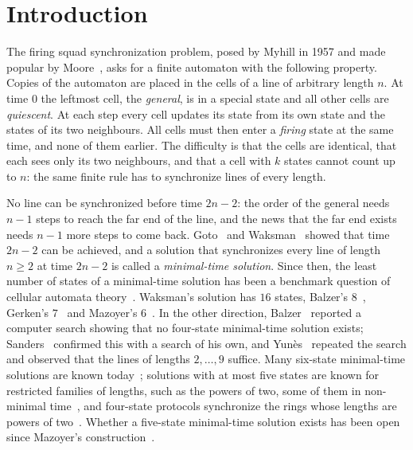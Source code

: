 \section{Introduction}\label{sec:intro}

The firing squad synchronization problem, posed by Myhill in 1957 and made
popular by Moore~\cite{Moore64}, asks for a finite automaton with the following
property. Copies of the automaton are placed in the cells of a line of
arbitrary length $n$. At time $0$ the leftmost cell, the \emph{general}, is in a
special state and all other cells are \emph{quiescent}. At each step every cell
updates its state from its own state and the states of its two neighbours. All
cells must then enter a \emph{firing} state at the same time, and none of them
earlier. The difficulty is that the cells are identical, that each sees only
its two neighbours, and that a cell with $k$ states cannot count up to $n$:
the same finite rule has to synchronize lines of every length.

No line can be synchronized before time $2n-2$: the order of the general needs
$n-1$ steps to reach the far end of the line, and the news that the far end
exists needs $n-1$ more steps to come back. Goto~\cite{Goto62} and
Waksman~\cite{Waksman66} showed that time $2n-2$ can be achieved, and a
solution that synchronizes every line of length $n\ge2$ at time $2n-2$ is
called a \emph{minimal-time solution}. Since then, the least number of states
of a minimal-time solution has been a benchmark question of cellular automata
theory~\cite{Mazoyer86,Umeo09,Correa17}. Waksman's solution has $16$ states,
Balzer's $8$~\cite{Balzer67}, Gerken's $7$~\cite{Gerken87} and Mazoyer's
$6$~\cite{Mazoyer87}. In the other direction, Balzer~\cite{Balzer67} reported
a computer search showing that no four-state minimal-time solution exists;
Sanders~\cite{Sanders94} confirmed this with a search of his own, and
Yun\`es~\cite{Yunes93} repeated the search and observed that the lines of
lengths $2,\dots,9$ suffice. Many
six-state minimal-time solutions are known today~\cite{Clergue18,NguyenMaignan20};
solutions with at most five states are known for restricted families of
lengths, such as the powers of two, some of them in non-minimal
time~\cite{UmeoYanagihara07,Yunes08}, and four-state protocols synchronize the
rings whose lengths are powers of two~\cite{UmeoKamikawaYunes09}. Whether a
five-state minimal-time solution exists has been open since Mazoyer's
construction~\cite{Umeo09,Correa17}.

